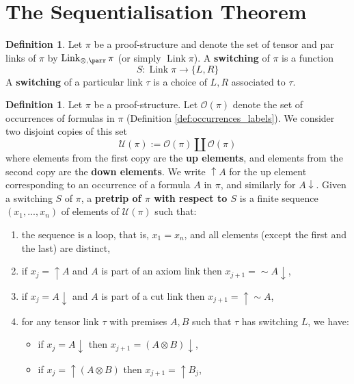 \documentclass[12pt]{article}
\theoremstyle{plain}
\theoremstyle{definition}
\newtheorem{defn}[thm]{Definition} %
\newcommand{\call}[1]{\mathcal{#1}}
\newcommand{\lto}{\longrightarrow}
\newcommand{\negation}{\sim}
\begin{document}
\section{The Sequentialisation Theorem}\label{sec:sequentialisation}
\begin{defn}
Let $\pi$ be a proof-structure and denote the set of tensor and par links of $\pi$ by $\operatorname{Link}_{\otimes,\parr}\pi$ (or simply $\operatorname{Link}\pi$). A \textbf{switching} of $\pi$ is a function
\begin{equation}
    S: \operatorname{Link}\pi \lto \lbrace L,R\rbrace
\end{equation}
A \textbf{switching} of a particular link $\tau$ is a choice of $L,R$ associated to $\tau$.
\end{defn}
\begin{defn}\label{def:trip}
Let $\pi$ be a proof-structure. Let $\call{O}(\pi)$ denote the set of occurrences of formulas in $\pi$ (Definition \ref{def:occurrences_labels}).   We consider two disjoint copies of this set 
\begin{equation}
    \call{U}(\pi) := \call{O}(\pi) \coprod \call{O}(\pi)
\end{equation}
where elements from the first copy are the \textbf{up elements}, and elements from the second copy are the \textbf{down elements}. We write $\uparrow A$ for the up element corresponding to an occurrence of a formula $A$ in $\pi$, and similarly for $A\downarrow$. Given a switching $S$ of $\pi$, a \textbf{pretrip of $\pi$ with respect to $S$} is a finite sequence $(x_1,...,x_n)$ of elements of $\call{U}(\pi)$ such that:
\begin{enumerate}
    \item the sequence is a loop, that is, $x_1 = x_n$, and all elements (except the first and the last) are distinct,
    \item\label{def:trip_axiom} if $x_j=\uparrow A$ and $A$ is part of an axiom link then $x_{j+1} = \negation A\downarrow$,
    \item if $x_j = A\downarrow$ and $A$ is part of a cut link then $x_{j+1} = \uparrow \negation A$,
    \item for any tensor link $\tau$ with premises $A,B$ such that $\tau$ has switching $L$, we have:
    \begin{itemize}
        \item if $x_j = A \downarrow$ then $x_{j+1} = (A \otimes B)\downarrow$,
        \item if $x_j = \uparrow (A \otimes B)$ then $x_{j+1} = \uparrow B_j$,

\end{itemize}
\end{enumerate}
\end{defn}
\end{document}
